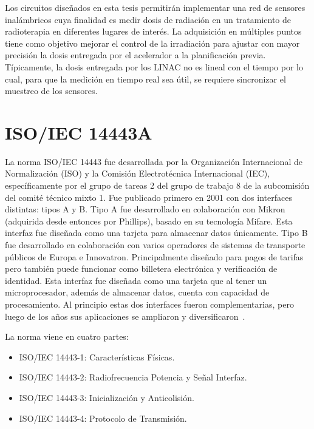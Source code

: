 \documentclass[a4paper, twoside, 11pt]{report}
\begin{document}
Los circuitos diseñados en esta tesis permitirán implementar una red de sensores inalámbricos cuya finalidad es medir dosis de radiación en un tratamiento de radioterapia en diferentes lugares de interés. La adquisición en múltiples puntos tiene como objetivo mejorar el control de la irradiación para ajustar con mayor precisión la dosis entregada por el acelerador a la planificación previa. Típicamente, la dosis entregada por los LINAC no es lineal con el tiempo por lo cual, para que la medición en tiempo real sea útil, se requiere sincronizar el muestreo de los sensores.

\FloatBarrier
\section{ISO/IEC 14443A}

La norma ISO/IEC 14443 fue desarrollada por la Organización Internacional de Normalización (ISO) y la Comisión Electrotécnica Internacional (IEC), específicamente por el grupo de tareas 2 del grupo de trabajo 8 de la subcomisión del comité técnico mixto 1. Fue publicado primero en 2001 con dos interfaces distintas: tipos A y B. Tipo A fue desarrollado en colaboración con Mikron (adquirida desde entonces por Phillips), basado en su tecnología Mifare. Esta interfaz fue diseñada como una tarjeta para almacenar datos únicamente. Tipo B fue desarrollado en colaboración con varios operadores de sistemas de transporte públicos de Europa e Innovatron. Principalmente diseñado para pagos de tarifas pero también puede funcionar como billetera electrónica y verificación de identidad. Esta interfaz fue diseñada como una tarjeta que al tener un microprocesador, además de almacenar datos, cuenta con capacidad de procesamiento. Al principio estas dos interfaces fueron complementarias, pero luego de los años sus aplicaciones se ampliaron y diversificaron~\cite{14443_a_vs_b}.

La norma viene en cuatro partes:

\begin{itemize}
    \item ISO/IEC 14443-1: Características Físicas.
    \item ISO/IEC 14443-2: Radiofrecuencia Potencia y Señal Interfaz.
    \item ISO/IEC 14443-3: Inicialización y Anticolisión.
    \item ISO/IEC 14443-4: Protocolo de Transmisión.
\end{itemize}
\end{document}
